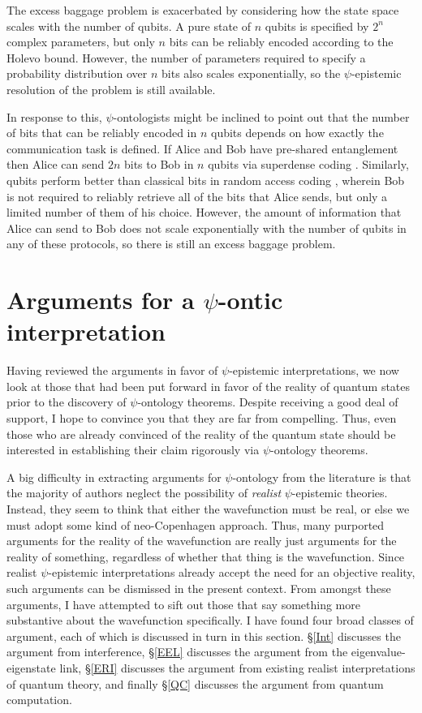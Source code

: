 \documentclass[DIV=calc,fontsize=12pt]{scrartcl} %
\theoremstyle{definition}
\theoremstyle{plain}
\begin{document}
The excess baggage problem is exacerbated by considering how the state
space scales with the number of qubits.  A pure state of $n$ qubits is
specified by $2^n$ complex parameters, but only $n$ bits can be
reliably encoded according to the Holevo bound.  However, the number
of parameters required to specify a probability distribution over $n$
bits also scales exponentially, so the $\psi$-epistemic resolution of
the problem is still available.

In response to this, $\psi$-ontologists might be inclined to point out
that the number of bits that can be reliably encoded in $n$ qubits
depends on how exactly the communication task is defined.  If Alice
and Bob have pre-shared entanglement then Alice can send $2n$ bits to
Bob in $n$ qubits via superdense coding \cite{Bennett1992}.
Similarly, qubits perform better than classical bits in random access
coding \cite{Ambainis1999}, wherein Bob is not required to reliably
retrieve all of the bits that Alice sends, but only a limited number
of them of his choice.  However, the amount of information that Alice
can send to Bob does not scale exponentially with the number of qubits
in any of these protocols, so there is still an excess baggage
problem.

\section{Arguments for a $\psi$-ontic interpretation}

\label{Ontic}

Having reviewed the arguments in favor of $\psi$-epistemic
interpretations, we now look at those that had been put forward in
favor of the reality of quantum states prior to the discovery of
$\psi$-ontology theorems.  Despite receiving a good deal of support, I
hope to convince you that they are far from compelling.  Thus, even
those who are already convinced of the reality of the quantum state
should be interested in establishing their claim rigorously via
$\psi$-ontology theorems.

A big difficulty in extracting arguments for $\psi$-ontology from the
literature is that the majority of authors neglect the possibility of
\emph{realist} $\psi$-epistemic theories.  Instead, they seem to think
that either the wavefunction must be real, or else we must adopt some
kind of neo-Copenhagen approach.  Thus, many purported arguments for
the reality of the wavefunction are really just arguments for the
reality of something, regardless of whether that thing is the
wavefunction.  Since realist $\psi$-epistemic interpretations already
accept the need for an objective reality, such arguments can be
dismissed in the present context.  From amongst these arguments, I
have attempted to sift out those that say something more substantive
about the wavefunction specifically.  I have found four broad classes
of argument, each of which is discussed in turn in this section.
\S\ref{Int} discusses the argument from interference, \S\ref{EEL}
discusses the argument from the eigenvalue-eigenstate link,
\S\ref{ERI} discusses the argument from existing realist
interpretations of quantum theory, and finally \S\ref{QC} discusses
the argument from quantum computation.
\end{document}
